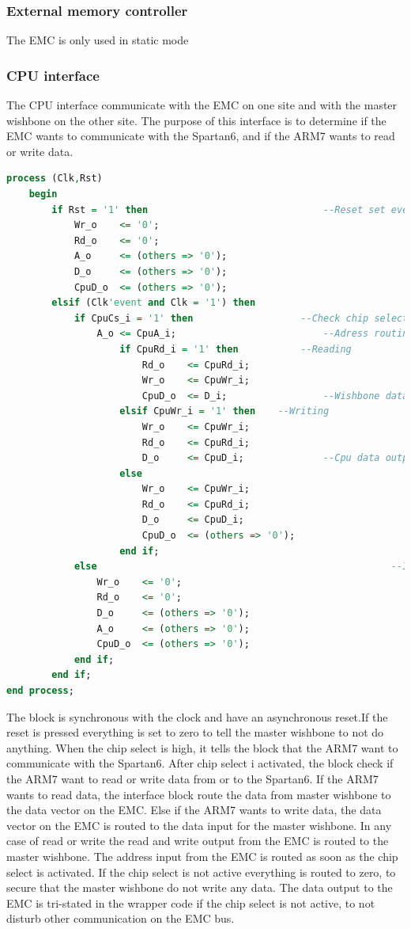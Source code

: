 \subsubsection{External memory controller}
The EMC is only used in static mode
\subsubsection{CPU interface}
The CPU interface communicate with the EMC on one site and with the master wishbone on the other site. The purpose of this interface is to determine if the EMC wants to communicate with the Spartan6, and if the ARM7 wants to read or write data.

\begin{lstlisting}[language=VHDL]
process (Clk,Rst)
	begin  
		if Rst = '1' then								--Reset set everything to 0
			Wr_o	<= '0';
			Rd_o	<= '0';
			A_o		<= (others => '0');
			D_o		<= (others => '0');
			CpuD_o	<= (others => '0');
		elsif (Clk'event and Clk = '1') then
			if CpuCs_i = '1' then					--Check chip select
				A_o	<= CpuA_i;							--Adress routing
					if CpuRd_i = '1' then			--Reading
						Rd_o	<= CpuRd_i;
						Wr_o	<= CpuWr_i;
						CpuD_o	<= D_i;					--Wishbone data out to Cpu data input
					elsif CpuWr_i = '1' then	--Writing
						Wr_o	<= CpuWr_i;					
						Rd_o	<= CpuRd_i;
						D_o		<= CpuD_i;				--Cpu data output to wishbone data input
					else
						Wr_o	<= CpuWr_i;		
						Rd_o	<= CpuRd_i;
						D_o		<= CpuD_i;
						CpuD_o	<= (others => '0');
					end if;
			else													--If chip select not high everything is set to 0
				Wr_o	<= '0';	
				Rd_o	<= '0';
				D_o		<= (others => '0');
				A_o		<= (others => '0');
				CpuD_o	<= (others => '0');
			end if;
		end if;
end process;
\end{lstlisting}
The block is synchronous with the clock and have an asynchronous reset.If the reset is pressed everything is set to zero to tell the master wishbone to not do anything. When the chip select is high, it tells the block that the ARM7 want to communicate with the Spartan6. After chip select i activated, the block check if the ARM7 want to read or write data from or to the Spartan6. If the ARM7 wants to read data, the interface block route the data from master wishbone to the data vector on the EMC. Else if the ARM7 wants to write data, the data vector on the EMC is routed to the data input for the master wishbone. In any case of read or write the read and write output from the EMC is routed to the master wishbone. The address input from the EMC is routed as soon as the chip select is activated. If the chip select is not active everything is routed to zero, to secure that the master wishbone do not write any data. The data output to the EMC is tri-stated in the wrapper code if the chip select is not active, to not disturb other communication on the EMC bus.

